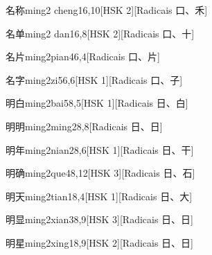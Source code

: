 \begin{entry}{名称}{ming2 cheng1}{6,10}[HSK 2][Radicais ⼝、⽲]
\end{entry}

\begin{entry}{名单}{ming2 dan1}{6,8}[HSK 2][Radicais ⼝、⼗]
\end{entry}

\begin{entry}{名片}{ming2pian4}{6,4}[Radicais ⼝、⽚]
\end{entry}

\begin{entry}{名字}{ming2zi5}{6,6}[HSK 1][Radicais ⼝、⼦]
\end{entry}

\begin{entry}{明白}{ming2bai5}{8,5}[HSK 1][Radicais ⽇、⽩]
\end{entry}

\begin{entry}{明明}{ming2ming2}{8,8}[Radicais ⽇、⽇]
\end{entry}

\begin{entry}{明年}{ming2nian2}{8,6}[HSK 1][Radicais ⽇、⼲]
\end{entry}

\begin{entry}{明确}{ming2que4}{8,12}[HSK 3][Radicais ⽇、⽯]
\end{entry}

\begin{entry}{明天}{ming2tian1}{8,4}[HSK 1][Radicais ⽇、⼤]
\end{entry}

\begin{entry}{明显}{ming2xian3}{8,9}[HSK 3][Radicais ⽇、⽇]
\end{entry}

\begin{entry}{明星}{ming2xing1}{8,9}[HSK 2][Radicais ⽇、⽇]
\end{entry}

